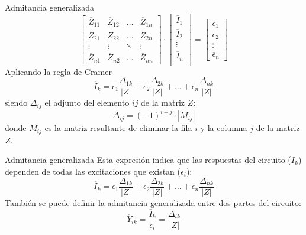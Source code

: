 \documentclass[aspectratio=169, usenames,svgnames,dvipsnames]{beamer}
\begin{document}
\begin{frame}[label={sec:org6da8621}]{Admitancia generalizada}
\begin{equation*}
  \begin{bmatrix}
    \overline{Z}_{11} & \overline{Z}_{12} & \dots & \overline{Z}_{1n} \\
    \overline{Z}_{21} & \overline{Z}_{22} & \dots & \overline{Z}_{2n} \\
    \vdots & \vdots & \ddots & \vdots \\
    \overline{Z}_{n1} & \overline{Z}_{n2} &  \dots & \overline{Z}_{nn}
  \end{bmatrix} \cdot %
  \begin{bmatrix}
    \overline{I}_1\\
    \overline{I}_2\\
    \vdots \\
    \overline{I}_n\\
  \end{bmatrix} = %
  \begin{bmatrix}
    \overline{\epsilon}_1\\
    \overline{\epsilon}_2\\
    \vdots \\
    \overline{\epsilon}_n
  \end{bmatrix}
\end{equation*}
Aplicando la regla de Cramer
\[
  \overline{I}_k = \overline{\epsilon}_1 \frac{\Delta_{1k}}{|Z|} + \overline{\epsilon}_2 \frac{\Delta_{2k}}{|Z|} + \dots + \overline{\epsilon}_n \frac{\Delta_{nk}}{|Z|}
\]
siendo \(\Delta_{ij}\) el adjunto del elemento \(ij\) de la matriz \(Z\):
\[
  \Delta_{ij} = (-1)^{i+j} \cdot |M_{ij}|
\]
donde \(M_{ij}\) es la matriz resultante de eliminar la fila \(i\) y la columna \(j\) de la matriz \(Z\).
\end{frame}

\begin{frame}[label={sec:orgec639d5}]{Admitancia generalizada}
Esta expresión indica que las respuestas del circuito (\(I_k\)) dependen de todas las excitaciones que existan (\(\epsilon_i\)):
\[
  \overline{I}_k = \overline{\epsilon}_1 \frac{\Delta_{1k}}{|Z|} + \overline{\epsilon}_2 \frac{\Delta_{2k}}{|Z|} + \dots + \overline{\epsilon}_n \frac{\Delta_{nk}}{|Z|}
\]
También se puede definir la admitancia generalizada entre dos partes del circuito:
\[
  \overline{Y}_{ik} = \frac{\overline{I}_k}{\overline{\epsilon}_i} = \frac{\Delta_{ik}}{|Z|}
\]
\end{frame}
\end{document}
